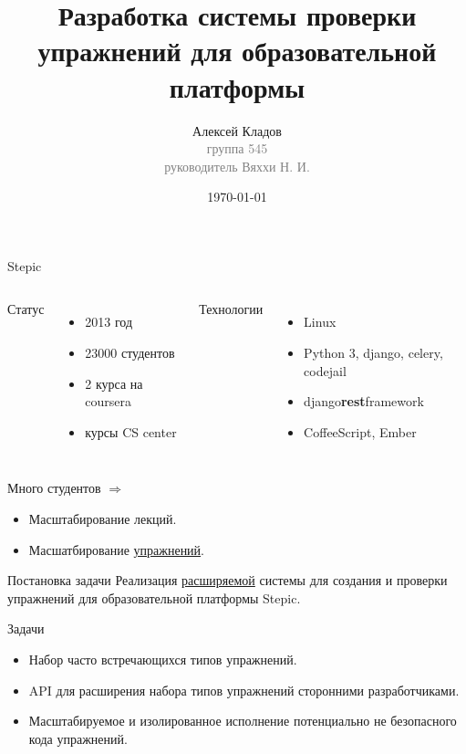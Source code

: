 \documentclass{beamer}
\title[Упражнения в Stepic]{Разработка системы проверки упражнений для
  образовательной платформы}
\author{Алексей Кладов\\
  { \footnotesize \textcolor{gray}{группа 545\\ руководитель Вяххи Н. И.}}}
\institute[СПбГУ]{Санк-Петербургский Государственный Университет}
\date{\today} %
\begin{document}
\begin{frame}
\titlepage %
\end{frame}

\begin{frame}{Stepic}
  \begin{columns}[t]
    Статус
    \begin{itemize}
    \item 2013 год
    \item 23000 студентов
    \item 2 курса на coursera
    \item курсы CS center
    \end{itemize}

    Технологии
    \begin{itemize}
    \item Linux
    \item Python 3, django, celery, codejail
    \item django\textbf{rest}framework
    \item CoffeeScript, Ember
    \end{itemize}
  \end{columns}

  \medskip

  Много студентов $\Rightarrow$
  \begin{itemize}
  \item Масштабирование лекций.
  \item Масшатбирование \underline{упражнений}.
  \end{itemize}
\end{frame}

\begin{frame}{Постановка задачи}
  Реализация \underline{расширяемой} системы для создания и проверки упражнений
  для образовательной платформы Stepic.

  \medskip

  Задачи
  \begin{itemize}
  \item Набор часто встречающихся типов упражнений.
  \item API для расширения набора типов упражнений
    сторонними разработчиками.
  \item Масштабируемое и изолированное исполнение потенциально не
    безопасного кода упражнений.
  \end{itemize}
\end{frame}
\end{document}
